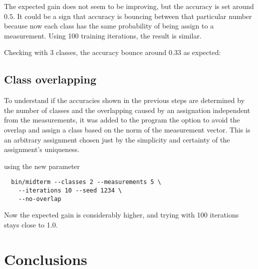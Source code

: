 \documentclass[letterpaper, conference]{IEEEtran}
\begin{document}
The expected gain does not seem to be improving, but the accuracy is set around $0.5$. It could be a sign that accuracy is bouncing between that particular number because now each class has the same probability of being assign to a measurement. Using 100 training iterations, the result is similar.

\begin{figure}[hbt]
  \label{fig:100-training-2-classes-uniform}
  \caption{}
\end{figure}

Checking with 3 classes, the accuracy bounce around $0.33$ as expected:

\begin{figure}[hbt]
  \label{fig:10-training-3-classes-uniform}
  \caption{}
\end{figure}

\subsection{Class overlapping}

To understand if the accuracies shown in the previous steps are determined by the number of classes and the overlapping caused by an assignation independent from the measurements, it was added to the program the option to avoid the overlap and assign a class based on the norm of the measurement vector. This is an arbitrary assignment chosen just by the simplicity and certainty of the assignment's uniqueness.

using the new parameter

\begin{verbatim}
  bin/midterm --classes 2 --measurements 5 \
    --iterations 10 --seed 1234 \
    --no-overlap
\end{verbatim}

\begin{figure}[hbt]
  \label{fig:10-training-2-classes-no-overlapping}
  \caption{}
\end{figure}

Now the expected gain is considerably higher, and trying with 100 iterations stays close to 1.0.

\begin{figure}[hbt]
  \label{fig:100-training-2-classes-no-overlapping}
  \caption{}
\end{figure}

\section{Conclusions}
\end{document}
